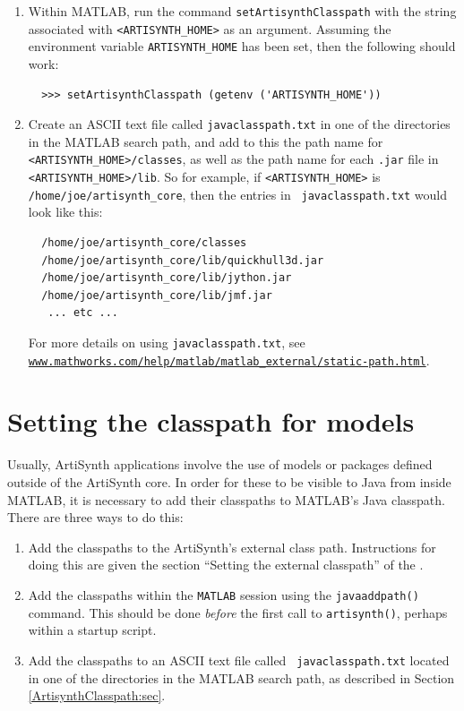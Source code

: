 \documentclass{article}
\begin{document}
\begin{enumerate}

\item Within MATLAB, run the command {\tt setArtisynthClasspath} with
the string associated with {\tt <ARTISYNTH\_HOME>} as an argument.
Assuming the environment variable {\tt ARTISYNTH\_HOME} has been
set, then the following should work:
%
\begin{verbatim}
  >>> setArtisynthClasspath (getenv ('ARTISYNTH_HOME'))
\end{verbatim}
%

\item Create an ASCII text file called {\tt javaclasspath.txt} in one
of the directories in the MATLAB search path, and add to
this the path name for {\tt <ARTISYNTH\_HOME>/classes}, as well as the
path name for each {\tt .jar} file in {\tt <ARTISYNTH\_HOME>/lib}.  So
for example, if {\tt <ARTISYNTH\_HOME>} is {\tt
/home/joe/artisynth\_core}, then the entries in {\tt
javaclasspath.txt} would look like this:
%
\begin{verbatim}
  /home/joe/artisynth_core/classes
  /home/joe/artisynth_core/lib/quickhull3d.jar
  /home/joe/artisynth_core/lib/jython.jar
  /home/joe/artisynth_core/lib/jmf.jar
   ... etc ...
\end{verbatim}
%
For more details on using {\tt javaclasspath.txt}, see\\
\href{https://www.mathworks.com/help/matlab/matlab_external/static-path.html}
{\tt www.mathworks.com/help/matlab/matlab\_external/static-path.html}.

\end{enumerate}

\section{Setting the classpath for models}
\label{ModelClasspath:sec}

Usually, ArtiSynth applications involve the use of models or packages
defined outside of the ArtiSynth core. In order for these to be
visible to Java from inside MATLAB, it is necessary to add their
classpaths to MATLAB's Java classpath. There are three ways to do this:

\begin{enumerate}

\item Add the classpaths to the ArtiSynth's external class path.
Instructions for doing this are given the section ``Setting the
external classpath'' of the .

\item Add the classpaths within the {\tt MATLAB} session using the
{\tt javaaddpath()} command. This should be done {\it before} the
first call to {\tt artisynth()}, perhaps within a startup script.

\item Add the classpaths to an ASCII text file called {\tt
javaclasspath.txt} located in one of the directories in the MATLAB
search path, as described in Section \ref{ArtisynthClasspath:sec}.

\end{enumerate}
\end{document}

